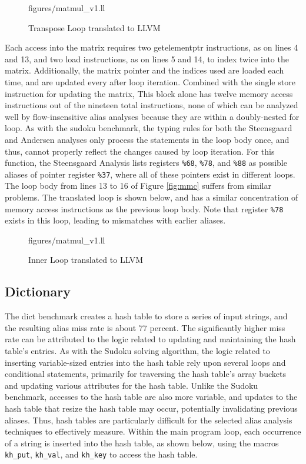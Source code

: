 \begin{figure} [h]
   {figures/matmul_v1.ll}
  \caption{Transpose Loop translated to LLVM}
  \label{fig:mmll}
\end{figure}

Each access into the matrix requires two getelementptr instructions, as on lines 4 and 13, and two load instructions, as on lines 5 and 14, to index twice into the matrix. Additionally, the matrix pointer and the indices used are loaded each time, and are updated every after loop iteration. Combined with the single store instruction for updating the matrix, This block alone has twelve memory access instructions out of the nineteen total instructions, none of which can be analyzed well by flow-insensitive alias analyses because they are within a doubly-nested for loop. As with the sudoku benchmark, the typing rules for both the Steensgaard and Andersen analyses only process the statements in the loop body once, and thus, cannot properly reflect the changes caused by loop iteration. For this function, the Steensgaard Analysis lists registers \texttt{\%68}, \texttt{\%78}, and \texttt{\%88} as possible aliases of pointer register \texttt{\%37}, where all of these pointers exist in different loops. The loop body from lines 13 to 16 of Figure \ref{fig:mmc} suffers from similar problems. The translated loop is shown below, and has a similar concentration of memory access instructions as the previous loop body. Note that register \texttt{\%78} exists in this loop, leading to mismatches with earlier aliases.

\begin{figure} [h]
   {figures/matmul_v1.ll}
  \caption{Inner Loop translated to LLVM}
  \label{fig:mmll2}
\end{figure}

\subsection{Dictionary}
The dict benchmark creates a hash table to store a series of input strings, and the resulting alias miss rate is about 77 percent. The significantly higher miss rate can be attributed to the logic related to updating and maintaining the hash table's entries. As with the Sudoku solving algorithm, the logic related to inserting variable-sized entries into the hash table rely upon several loops and conditional statements, primarily for traversing the hash table's array buckets and updating various attributes for the hash table. Unlike the Sudoku benchmark, accesses to the hash table are also more variable, and updates to the hash table that resize the hash table may occur, potentially invalidating previous aliases. Thus, hash tables are particularly difficult for the selected alias analysis techniques to effectively measure. Within the main program loop, each occurrence of a string is inserted into the hash table, as shown below, using the macros \texttt{kh\_put}, \texttt{kh\_val}, and \texttt{kh\_key} to access the hash table.

